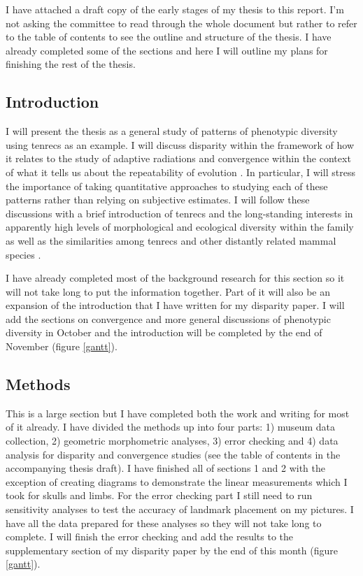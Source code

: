 \documentclass[12pt,a4paper]{article}
\begin{document}
	I have attached a draft copy of the early stages of my thesis to this report. I'm not asking the committee to read through the whole document but rather to refer to the table of contents to see the outline and structure of the thesis. I have already completed some of the sections and here I will outline my plans for finishing the rest of the thesis.

\subsection{Introduction}

	I will present the thesis as a general study of patterns of phenotypic diversity using tenrecs as an example.
	I will discuss disparity within the framework of how it relates to the study of adaptive radiations \citep{Losos2010a} and convergence within the context of what it tells us about the repeatability of evolution \citep[e.g][]{Blount2008}. In particular, I will stress the importance of taking quantitative approaches to studying each of these patterns rather than relying on subjective estimates. I will follow these discussions with a brief introduction of tenrecs and the long-standing interests in apparently high levels of morphological and ecological diversity within the family as well as the similarities among tenrecs and other distantly related mammal species \citep[e.g.][]{Eisenberg1969, Soarimalala2011, Olson2013}. 

	I have already completed most of the background research for this section so it will not take long to put the information together. Part of it will also be an expansion of the introduction that I have written for my disparity paper. I will add the sections on convergence and more general discussions of phenotypic diversity in October and the introduction will be completed by the end of November (figure \ref*{gantt}).

\subsection{Methods}

	This is a large section but I have completed both the work and writing for most of it already.
	I have divided the methods up into four parts: 1) museum data collection, 2) geometric morphometric analyses, 3) error checking and 4) data analysis for disparity and convergence studies (see the table of contents in the accompanying thesis draft).
	I have finished all of sections 1 and 2 with the exception of creating diagrams to demonstrate the linear measurements which I took for skulls and limbs. For the error checking part I still need to run sensitivity analyses to test the accuracy of landmark placement on my pictures. I have all the data prepared for these analyses so they will not take long to complete. I will finish the error checking and add the results to the supplementary section of my disparity paper by the end of this month (figure \ref{gantt}).
	
\end{document}
